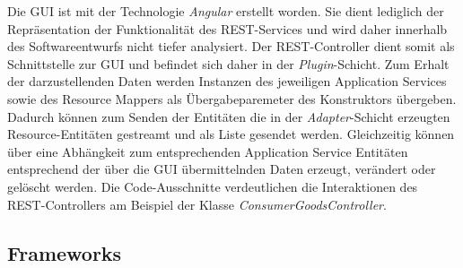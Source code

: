 Die GUI ist mit der Technologie \textit{Angular} erstellt worden.
Sie dient lediglich der Repräsentation der Funktionalität des \ac{REST}-Services und wird daher innerhalb des Softwareentwurfs nicht tiefer analysiert.
Der \ac{REST}-Controller dient somit als Schnittstelle zur \ac{GUI} und befindet sich daher in der \textit{Plugin}-Schicht.
Zum Erhalt der darzustellenden Daten werden Instanzen des jeweiligen Application Services sowie des Resource Mappers als Übergabeparemeter des Konstruktors übergeben.
Dadurch können zum Senden der Entitäten die in der \textit{Adapter}-Schicht erzeugten Resource-Entitäten gestreamt und als Liste gesendet werden.
Gleichzeitig können über eine Abhängkeit zum entsprechenden Application Service Entitäten entsprechend der über die \ac{GUI} übermittelnden Daten erzeugt, verändert oder gelöscht werden.
Die Code-Ausschnitte verdeutlichen die Interaktionen des \ac{REST}-Controllers am Beispiel der Klasse \textit{ConsumerGoodsController}.


\subsection*{Frameworks}
